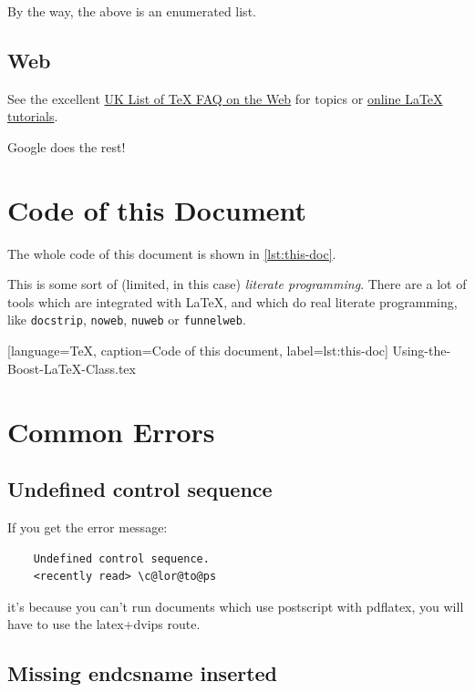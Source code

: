 \documentclass{boostreport}
\begin{document}
\begin{boostnote}
    By the way, the above is an enumerated list.
\end{boostnote}

\subsection{Web}
\label{sec:web}

See the excellent \href{http://www.tex.ac.uk/cgi-bin/texfaq2html}{UK List of
TeX FAQ on the Web} for topics or
\href{http://www.tex.ac.uk/cgi-bin/texfaq2html?label=man-latex}{online LaTeX
tutorials}.

Google does the rest!


\section{Code of this Document}
\label{sec:code-this-document}

The whole code of this document is shown in \autoref{lst:this-doc}.

This is some sort of (limited, in this case) \emph{literate programming}.
There are a lot of tools which are integrated with \LaTeX{}, and which do
real literate programming, like \texttt{docstrip}, \texttt{noweb},
\texttt{nuweb} or \texttt{funnelweb}.


    [language=TeX,%
    caption=Code of this document,%
    label=lst:this-doc]
    {Using-the-Boost-LaTeX-Class.tex}


\section{Common Errors}
\label{sec:common-errors}

\subsection{Undefined control sequence}

If you get the error message:

\begin{verbatim}
    Undefined control sequence.
    <recently read> \c@lor@to@ps
\end{verbatim}

it's because you can't run documents which use postscript with pdflatex, you
will have to use the latex+dvips route.

\subsection{Missing endcsname inserted}
\end{document}
